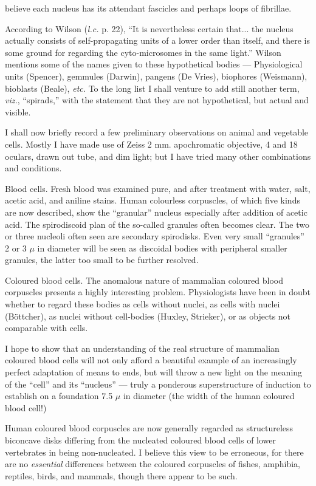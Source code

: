 \documentclass[a4paper, 12pt, oneside]{article}
\begin{document}
believe each nucleus has its attendant fascicles and perhaps loops of fibrillae.

According to Wilson (\emph{l.c.} p. 22), ``It is nevertheless certain that... the nucleus actually consists of self-propagating units of a lower order than itself, and there is some ground for regarding the cyto-microsomes in the same light.'' Wilson mentions some of the names given to these hypothetical bodies --- Physiological units (Spencer), gemmules (Darwin), pangens (De Vries), biophores (Weismann), bioblasts (Beale), \emph{etc.} To the long list I shall venture to add still another term, \emph{viz.}, ``spirads,'' with the statement that they are not hypothetical, but actual and visible.

I shall now briefly record a few preliminary observations on animal and vegetable cells. Mostly I have made use of Zeiss 2 mm. apochromatic objective, 4 and 18 oculars, drawn out tube, and dim light; but I have tried many other combinations and conditions.

Blood cells. Fresh blood was examined pure, and after treatment with water, salt, acetic acid, and aniline stains. Human colourless corpuscles, of which five kinds are now described, show the ``granular'' nucleus especially after addition of acetic acid. The spirodiscoid plan of the so-called granules often becomes clear. The two or three nucleoli often seen are secondary spirodisks. Even very small ``granules'' 2 or 3 $\mu$ in diameter will be seen as discoidal bodies with peripheral smaller granules, the latter too small to be further resolved.

Coloured blood cells. The anomalous nature of mammalian coloured blood corpuscles presents a highly interesting problem. Physiologists have been in doubt whether to regard these bodies as cells without nuclei, as cells with nuclei (Böttcher), as nuclei without cell-bodies (Huxley, Strieker), or as objects not comparable with cells.

I hope to show that an understanding of the real structure of mammalian coloured blood cells will not only afford a beautiful example of an increasingly perfect adaptation of means to ends, but will throw a new light on the meaning of the ``cell'' and its ``nucleus'' --- truly a ponderous superstructure of induction to establish on a foundation 7.5 $\mu$ in diameter (the width of the human coloured blood cell!)

Human coloured blood corpuscles are now generally regarded as structureless biconcave disks differing from the nucleated coloured blood cells of lower vertebrates in being non-nucleated. I believe this view to be erroneous, for there are no \emph{essential} differences between the coloured corpuscles of fishes, amphibia, reptiles, birds, and mammals, though there appear to be such.
\end{document}
